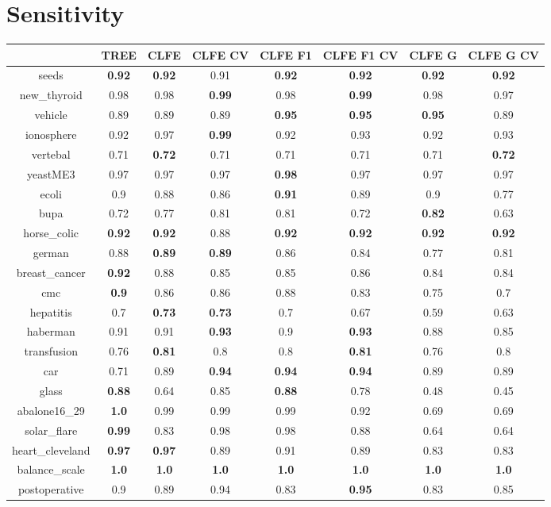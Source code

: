 \documentclass{article}%
\begin{document}
%
\section*{Sensitivity}%
\begin{tabular}{c|ccccccc}%
\hline%
&TREE&CLFE&CLFE CV&CLFE F1&CLFE F1 CV&CLFE G&CLFE G CV\\%
\hline%
seeds&\textbf{0.92}&\textbf{0.92}&0.91&\textbf{0.92}&\textbf{0.92}&\textbf{0.92}&\textbf{0.92}\\%
new\_thyroid&0.98&0.98&\textbf{0.99}&0.98&\textbf{0.99}&0.98&0.97\\%
vehicle&0.89&0.89&0.89&\textbf{0.95}&\textbf{0.95}&\textbf{0.95}&0.89\\%
ionosphere&0.92&0.97&\textbf{0.99}&0.92&0.93&0.92&0.93\\%
vertebal&0.71&\textbf{0.72}&0.71&0.71&0.71&0.71&\textbf{0.72}\\%
yeastME3&0.97&0.97&0.97&\textbf{0.98}&0.97&0.97&0.97\\%
ecoli&0.9&0.88&0.86&\textbf{0.91}&0.89&0.9&0.77\\%
bupa&0.72&0.77&0.81&0.81&0.72&\textbf{0.82}&0.63\\%
horse\_colic&\textbf{0.92}&\textbf{0.92}&0.88&\textbf{0.92}&\textbf{0.92}&\textbf{0.92}&\textbf{0.92}\\%
german&0.88&\textbf{0.89}&\textbf{0.89}&0.86&0.84&0.77&0.81\\%
breast\_cancer&\textbf{0.92}&0.88&0.85&0.85&0.86&0.84&0.84\\%
cmc&\textbf{0.9}&0.86&0.86&0.88&0.83&0.75&0.7\\%
hepatitis&0.7&\textbf{0.73}&\textbf{0.73}&0.7&0.67&0.59&0.63\\%
haberman&0.91&0.91&\textbf{0.93}&0.9&\textbf{0.93}&0.88&0.85\\%
transfusion&0.76&\textbf{0.81}&0.8&0.8&\textbf{0.81}&0.76&0.8\\%
car&0.71&0.89&\textbf{0.94}&\textbf{0.94}&\textbf{0.94}&0.89&0.89\\%
glass&\textbf{0.88}&0.64&0.85&\textbf{0.88}&0.78&0.48&0.45\\%
abalone16\_29&\textbf{1.0}&0.99&0.99&0.99&0.92&0.69&0.69\\%
solar\_flare&\textbf{0.99}&0.83&0.98&0.98&0.88&0.64&0.64\\%
heart\_cleveland&\textbf{0.97}&\textbf{0.97}&0.89&0.91&0.89&0.83&0.83\\%
balance\_scale&\textbf{1.0}&\textbf{1.0}&\textbf{1.0}&\textbf{1.0}&\textbf{1.0}&\textbf{1.0}&\textbf{1.0}\\%
postoperative&0.9&0.89&0.94&0.83&\textbf{0.95}&0.83&0.85\\%
\end{tabular}
\end{document}
